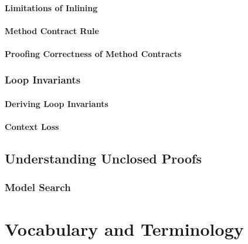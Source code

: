 \documentclass[a4paper, 11pt, accentcolor = tud3b]{tudreport}
\begin{document}
				\subsubsection{Limitations of Inlining} %

				\subsubsection{Method Contract Rule} %

				\subsubsection{Proofing Correctness of Method Contracts} %

			\subsection{Loop Invariants} %
				\label{sec:dlLoopInv}
			

				\subsubsection{Deriving Loop Invariants} %

				\subsubsection{Context Loss} %

		\section{Understanding Unclosed Proofs} %

			\subsection{Model Search} %
	
	
	\appendix
	
	\chapter{Vocabulary and Terminology}
\end{document}
